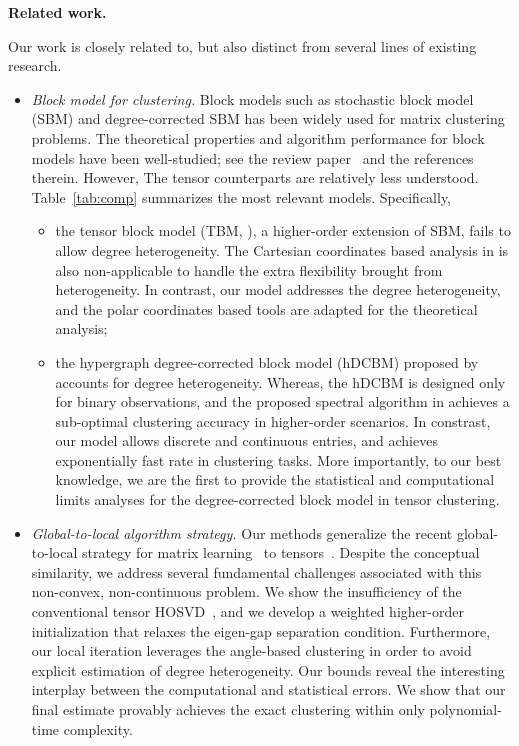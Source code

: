 \documentclass[lettersize,onecolumn,journal]{IEEEtran}
\theoremstyle{definition}
\theoremstyle{definition}
\begin{document}
{\bf Related work.} 
{\color{blue}
Our work is closely related to, but also distinct from several lines of existing research. 
\begin{itemize}
    \item \textit{Block model for clustering.} Block models such as stochastic block model (SBM) and degree-corrected SBM has been widely used for matrix clustering problems. The theoretical properties and algorithm performance for block models have been well-studied; see the review paper~\citep{abbe2017community} and the references therein. However, The tensor counterparts are relatively less understood. Table~\ref{tab:comp} summarizes the most relevant models. Specifically,
    \begin{itemize}
        \item the tensor block model (TBM, \cite{wang2019multiway, han2020exact}), a higher-order extension of SBM, fails to allow degree heterogeneity. The Cartesian coordinates based analysis in \cite{han2020exact} is also non-applicable to handle the extra flexibility brought from heterogeneity. In contrast, our model addresses the degree heterogeneity, and the polar coordinates based tools are adapted for the theoretical analysis;
        \item the hypergraph degree-corrected block model (hDCBM) proposed by \cite{ke2019community, yuan2018testing} accounts for degree heterogeneity. Whereas, the hDCBM is designed only for binary observations, and the proposed spectral algorithm in \cite{ke2019community} achieves a sub-optimal clustering accuracy in higher-order scenarios. In constrast, our model allows discrete and continuous entries, and achieves exponentially fast rate in clustering tasks. More importantly, to our best knowledge, we are the first to provide the statistical and computational limits analyses for the degree-corrected block model in tensor clustering.
    \end{itemize}
    
    \item \textit{Global-to-local algorithm strategy.} Our methods generalize the recent global-to-local strategy for matrix learning~\citep{gao2018community,chi2019nonconvex,yun2016optimal} to tensors~\citep{han2020exact,ahn2018hypergraph,kim2018stochastic}. Despite the conceptual similarity, we address several fundamental challenges associated with this non-convex, non-continuous problem. We show the insufficiency of the conventional tensor HOSVD~\citep{kolda2009tensor}, and we develop a weighted higher-order initialization that relaxes the eigen-gap separation condition. Furthermore, our local iteration leverages the angle-based clustering in order to avoid explicit estimation of degree heterogeneity. Our bounds reveal the interesting interplay between the computational and statistical errors. We show that our final estimate provably achieves the exact clustering within only polynomial-time complexity. 
    
\end{itemize}
}
\end{document}
